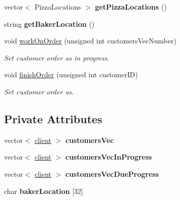 \begin{CompactItemize}
\item 
\hypertarget{class_baker_3d38e7498fba59674c7d3838bf4c1824}{
vector$<$ Pizza\-Locations $>$ {\bf get\-Pizza\-Locations} ()}
\label{class_baker_3d38e7498fba59674c7d3838bf4c1824}

\item 
\hypertarget{class_baker_363b0d0c242923ca3a76ebd4e608cc2d}{
string {\bf get\-Baker\-Location} ()}
\label{class_baker_363b0d0c242923ca3a76ebd4e608cc2d}

\item 
void \hyperlink{class_baker_9616413c80f3814907a9c2399ac50438}{work\-On\-Order} (unsigned int customers\-Vec\-Number)
\begin{CompactList}\small\item\em Set customer order as in progress. \item\end{CompactList}\item 
void \hyperlink{class_baker_222a16bf113b70cbe0388a7291978a57}{finish\-Order} (unsigned int customer\-ID)
\begin{CompactList}\small\item\em Set customer order as. \item\end{CompactList}\end{CompactItemize}
\subsection*{Private Attributes}
\begin{CompactItemize}
\item 
\hypertarget{class_baker_52cc86469dd41b9be5b7186d6bd00589}{
vector$<$ \hyperlink{classclient}{client} $>$ {\bf customers\-Vec}}
\label{class_baker_52cc86469dd41b9be5b7186d6bd00589}

\item 
\hypertarget{class_baker_0b7dacb9817ff529ee046a5c369051fa}{
vector$<$ \hyperlink{classclient}{client} $>$ {\bf customers\-Vec\-In\-Progress}}
\label{class_baker_0b7dacb9817ff529ee046a5c369051fa}

\item 
\hypertarget{class_baker_e9843b8d2c12d0911de538ebe51c1b0d}{
vector$<$ \hyperlink{classclient}{client} $>$ {\bf customers\-Vec\-Due\-Progress}}
\label{class_baker_e9843b8d2c12d0911de538ebe51c1b0d}

\item 
\hypertarget{class_baker_c8a23bee3af95af3a6fa8e3f631e9a92}{
char {\bf baker\-Location} \mbox{[}32\mbox{]}}
\label{class_baker_c8a23bee3af95af3a6fa8e3f631e9a92}

\end{CompactItemize}


